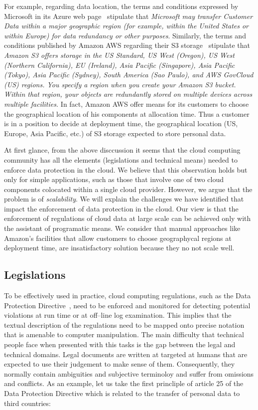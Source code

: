 \documentclass[runningheads,a4paper]{llncs}
\begin{document}
For example, regarding data location, the terms and conditions 
expressed by Microsoft in its Azure web page~\cite{MSAzurePrivacy2014} 
stipulate that \emph{Microsoft may transfer Customer Data within 
a major geographic region (for example, within the United States 
or within Europe) for data redundancy or other purposes}. Similarly,
the terms and conditions published by Amazon AWS regarding their
S3 storage~\cite{AmazonS3faqs2014} stipulate that
\emph{Amazon S3 offers storage in the US Standard, US West (Oregon), 
      US West (Northern California), EU (Ireland), Asia Pacific (Singapore), 
      Asia Pacific (Tokyo), Asia Pacific (Sydney), South America (Sao Paulo), 
      and AWS GovCloud (US) regions. You specify a region when you create 
      your Amazon S3 bucket. Within that region, your objects are redundantly 
      stored on multiple devices across multiple facilities.} In fact,
Amazon AWS offer means for its customers to choose the geographical
location of his components at allocation time. Thus a customer is in a position
to decide at deployment time, the geographical location (US, Europe, 
Asia Pacific, etc.) of S3 storage expected to store personal data. 

At first glance, from the above disccussion it seems that the cloud computing 
community has all the elements (legislations and technical means) needed to 
enforce data protection in the cloud. We believe that this 
observation holds but only for simple applications, such as those that involve one of two 
cloud components colocated within a single cloud provider. However, we 
argue that the problem is of \emph{scalability}. We will explain the challenges
we have identified that impact the enforcement of data protection in the 
cloud. Our view is that the enforcement of regulations of
cloud data at large scale can be achieved only with the assistant of
programatic means. We consider that manual approaches like Amazon's 
facilities that allow customers to choose geographycal regions at
deployment time, are insatisfactory solution because they no not
scale well. 

\subsection{Legislations}
To be effectively used in practice, cloud computing regulations, such as the Data Protection
Directive~\cite{DPDoct1995}, need to be enforced and monitored for detecting potential violations
at run time or at off--line log examination. This implies that the textual description
of the regulations need to be mapped onto precise notation that is amenable to
computer manipulation.  The main difficulty that technical people face when presented 
with this tasks is the gap between the legal and technical domains. Legal documents 
are written at targeted at humans that are expected to use their judgement to 
make sense of them.  Consequently, they normally contain ambiguities and subjective
terminoloy and suffer from omissions and conflicts.  As an example, let us
take the first princliple of article 25 of the Data Protection Directive which is related to the transfer
of personal data to third countries:
\end{document}
